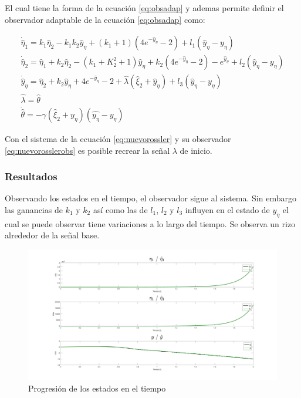 El cual tiene la forma de la ecuación \ref{eq:obsadap} y ademas permite definir el observador adaptable de la ecuación \ref{eq:obsadap} como:

\begin{equation}\label{eq:nuevorosslerobs}
	\begin{array}{l}
		\dot{\hat{\eta}}_1 = k_1 \hat{\eta}_2 - k_1k_2\hat{y}_\eta + (k_1+1)(4e^{-\hat{y}_\eta}-2) + l_1(\hat{y}_\eta - y_\eta)\\
		\dot{\hat{\eta}}_2 = \hat{\eta}_1 + k_2 \hat{\eta}_2 - (k_1 + K_2^2 + 1)\hat{y}_\eta + k_2(4e^{-\hat{y}_\eta} - 2) - e^{\hat{y}_\eta} + l_2(\hat{y}_\eta - y_\eta)\\
		\dot{\hat{y}}_\eta = \hat{\eta}_2 + k_2\hat{y}_\eta + 4e^{-\hat{y}_\eta} - 2 + \hat{\lambda}(\hat{\xi}_2 + \hat{y}_\eta) + l_3(\hat{y}_\eta - y_\eta)\\
		\hat{\lambda} = \hat{\theta}\\
		\dot{\hat{\theta}} = -\gamma(\hat{\xi}_2 + y_\eta)(\hat{y_\eta} - y_\eta)
	\end{array}
\end{equation}

Con el sistema de la ecuación \ref{eq:nuevorossler} y su observador \ref{eq:nuevorosslerobs} es posible recrear la señal $\lambda$ de inicio.\\

\subsubsection*{Resultados}

Observando los estados en el tiempo, el observador sigue al sistema. Sin embargo las ganancias de $k_1$ y $k_2$ así como las de $l_1$, $l_2$ y $l_3$ influyen en el estado de $y_\eta$ el cual se  puede observar tiene variaciones a lo largo del tiempo. Se observa un rizo alrededor de la señal base.

\begin{figure}[H]
	\centering
	\includegraphics[width=150mm]{img/E3_Estados.png}
	\caption{Progresión de los estados en el tiempo}
	\label{img:rossler5}
\end{figure}

